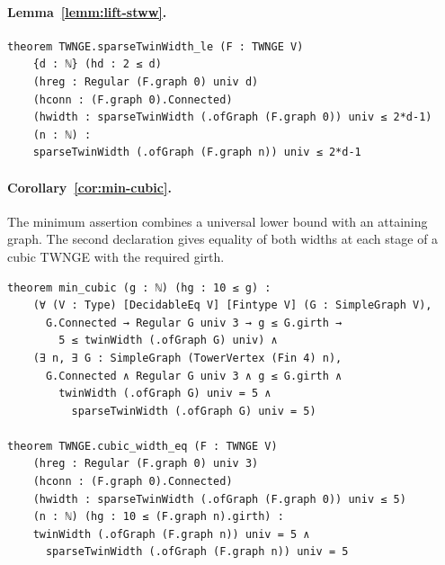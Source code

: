 \par\medskip
\noindent\begin{minipage}{\linewidth}
\paragraph*{Lemma~\ref{lemm:lift-stww}.}
\begin{lstlisting}
theorem TWNGE.sparseTwinWidth_le (F : TWNGE V)
    {d : ℕ} (hd : 2 ≤ d)
    (hreg : Regular (F.graph 0) univ d)
    (hconn : (F.graph 0).Connected)
    (hwidth : sparseTwinWidth (.ofGraph (F.graph 0)) univ ≤ 2*d-1)
    (n : ℕ) :
    sparseTwinWidth (.ofGraph (F.graph n)) univ ≤ 2*d-1
\end{lstlisting}
\end{minipage}
\par\medskip
\noindent\begin{minipage}{\linewidth}
\paragraph*{Corollary~\ref{cor:min-cubic}.}
The minimum assertion combines a universal lower bound with an attaining
graph. The second declaration gives equality of both widths at each
stage of a cubic TWNGE with the required girth.
\begin{lstlisting}
theorem min_cubic (g : ℕ) (hg : 10 ≤ g) :
    (∀ (V : Type) [DecidableEq V] [Fintype V] (G : SimpleGraph V),
      G.Connected → Regular G univ 3 → g ≤ G.girth →
        5 ≤ twinWidth (.ofGraph G) univ) ∧
    (∃ n, ∃ G : SimpleGraph (TowerVertex (Fin 4) n),
      G.Connected ∧ Regular G univ 3 ∧ g ≤ G.girth ∧
        twinWidth (.ofGraph G) univ = 5 ∧
          sparseTwinWidth (.ofGraph G) univ = 5)

theorem TWNGE.cubic_width_eq (F : TWNGE V)
    (hreg : Regular (F.graph 0) univ 3)
    (hconn : (F.graph 0).Connected)
    (hwidth : sparseTwinWidth (.ofGraph (F.graph 0)) univ ≤ 5)
    (n : ℕ) (hg : 10 ≤ (F.graph n).girth) :
    twinWidth (.ofGraph (F.graph n)) univ = 5 ∧
      sparseTwinWidth (.ofGraph (F.graph n)) univ = 5
\end{lstlisting}
\end{minipage}
\par\medskip

